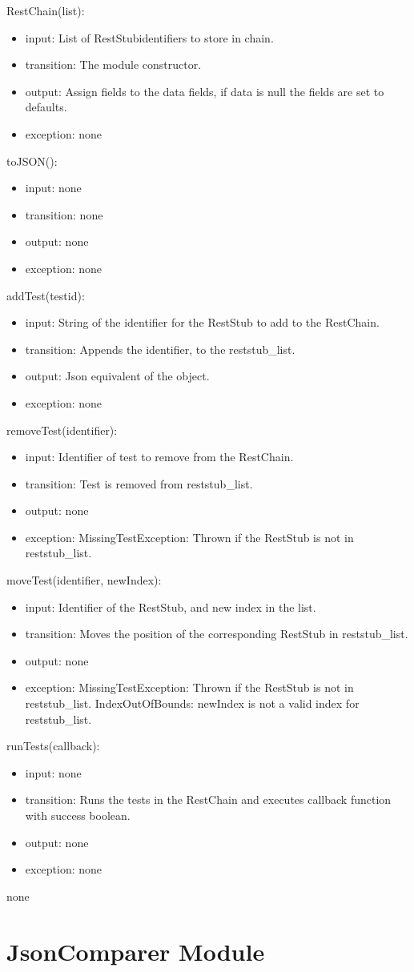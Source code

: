 \documentclass[12pt, titlepage]{article}
\newcommand{\newAccessProgram}[5]{
	\noindent #1:
		\begin{itemize}
		    \item input: #2
			\item transition: #3
			\item output: #4
			\item exception: #5
		\end{itemize}
}
\begin{document}
	{%
		\newAccessProgram{RestChain(list)}
			{%
				List of RestStubidentifiers to store in chain.
			}
			{%
				The module constructor.
			}
			{%
				Assign fields to the data fields, if data is null the fields are set to defaults.
			}
			{%
				none
			}
		\newAccessProgram{toJSON()}
			{%
				none
			}
			{%
				none
			}
			{%
				none
			}
			{%
				none
			}
			\newAccessProgram{addTest(testid)}
			{%
				String of the identifier for the RestStub to add to the RestChain.
			}
			{%
				Appends the identifier, to the reststub\_list.
			}
			{%
				Json equivalent of the object.
			}
			{%
				none
			}
		\newAccessProgram{removeTest(identifier)}
			{%
				Identifier of test to remove from the RestChain.
			}
			{%
				Test is removed from reststub\_list.
			}
			{%
				none
			}
			{%
				MissingTestException: Thrown if the RestStub is not in reststub\_list.
			}
			\newAccessProgram{moveTest(identifier, newIndex)}
			{%
				Identifier of the RestStub, and new index in the list.
			}
			{%
				Moves the position of the corresponding RestStub in reststub\_list.
			}
			{%
				none
			}
			{%
				MissingTestException: Thrown if the RestStub is not in reststub\_list.
IndexOutOfBounds: newIndex is not a valid index for reststub\_list.
			}
		\newAccessProgram{runTests(callback)}
			{%
				none
			}
			{%
				Runs the tests in the RestChain and executes callback function with success boolean.
			}
			{%
				none
			}
			{%
				none
			}
			
	}
	{%
		none
	}
	
\newpage

\section {JsonComparer Module}
\end{document}
